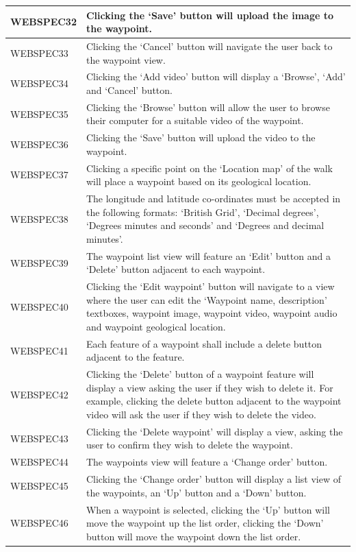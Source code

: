 \documentclass[11pt,a4paper]{article}
\begin{document}
\begin{longtable}{|p{2.5cm}p{13cm}|}
WEBSPEC32 & Clicking the `Save' button will upload the image to the waypoint. \\ \hline
WEBSPEC33 & Clicking the `Cancel' button will navigate the user back to the waypoint view. \\ \hline
WEBSPEC34 & Clicking the `Add video' button will display a `Browse', `Add' and `Cancel' button. \\ \hline
WEBSPEC35 & Clicking the `Browse' button will allow the user to browse their computer for a suitable video of the waypoint. \\ \hline
WEBSPEC36 & Clicking the `Save' button will upload the video to the waypoint. \\ \hline
WEBSPEC37 & Clicking a specific point on the `Location map' of the walk will place a waypoint based on its geological location. \\ \hline
WEBSPEC38 & The longitude and latitude co-ordinates must be accepted in the following formats: `British Grid', `Decimal degrees', `Degrees minutes and seconds' and `Degrees and decimal minutes'. \\ \hline
WEBSPEC39 & The waypoint list view will feature an `Edit' button and a `Delete' button adjacent to each waypoint. \\ \hline
WEBSPEC40 & Clicking the `Edit waypoint' button will navigate to a view where the user can edit the `Waypoint name, description' textboxes, waypoint image, waypoint video, waypoint audio and waypoint geological location. \\ \hline
WEBSPEC41 & Each feature of a waypoint shall include a delete button adjacent to the feature. \\ \hline
WEBSPEC42 & Clicking the `Delete' button of a waypoint feature will display a view asking the user if they wish to delete it. For example, clicking the delete button adjacent to the waypoint video will ask the user if they wish to delete the video. \\ \hline
WEBSPEC43 & Clicking the `Delete waypoint' will display a view, asking the user to confirm they wish to delete the waypoint. \\ \hline
WEBSPEC44 & The waypoints view will feature a `Change order' button. \\ \hline
WEBSPEC45 & Clicking the `Change order' button will display a list view of the waypoints, an `Up' button and a `Down' button. \\ \hline
WEBSPEC46 & When a waypoint is selected, clicking the `Up' button will move the waypoint up the list order, clicking the `Down' button will move the waypoint down the list order. \\ \hline

\end{longtable}
\end{document}
